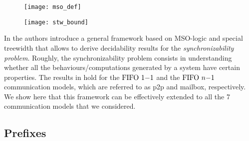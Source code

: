 \begin{figure}[h]
	\begin{center}
	\texttt{[image: mso\_def]}
	\end{center}
\end{figure}

\begin{figure}[h]
	\begin{center}
	\texttt{[image: stw\_bound]}
	\end{center}
\end{figure}

In \cite{BolligFG21} the authors introduce a general framework based on MSO-logic and special treewidth that allows to derive decidability results for the \emph{synchronizability problem}. Roughly, the synchronizability problem consists in understanding whether all the behaviours/computations generated by a system have certain properties. The results in \cite{BolligFG21} hold for the $\text{FIFO } 1\mathsf{-}1$ and the $\text{FIFO } n\mathsf{-}1$ communication models, which are referred to as p2p and mailbox, respectively. We show here that this framework can be effectively extended to all the 7 communication models that we considered. 




\subsection{Prefixes}

